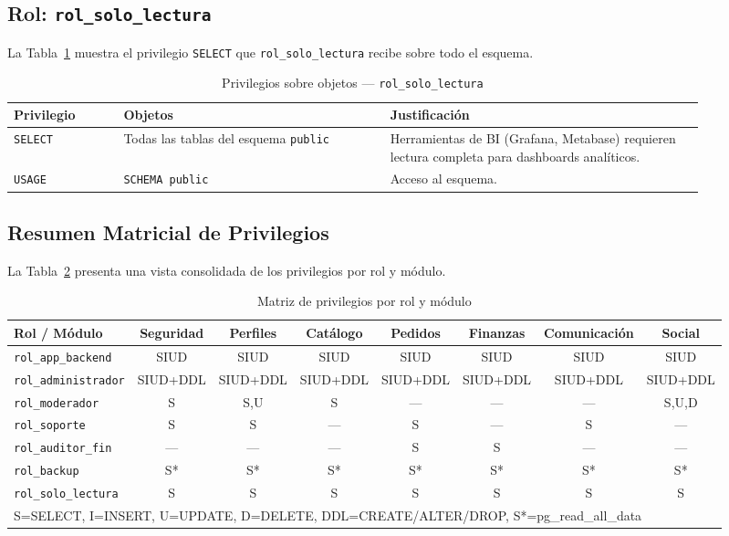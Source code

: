 \documentclass[conference, onecolumn]{IEEEtran}
\begin{document}
\subsection{Rol: \texttt{rol\_solo\_lectura}}

La Tabla~\ref{tab:priv_readonly} muestra el privilegio \texttt{SELECT} que \texttt{rol\_solo\_lectura} recibe sobre todo el esquema.

\begin{table}[H]
\centering
\caption{Privilegios sobre objetos — \texttt{rol\_solo\_lectura}}
\label{tab:priv_readonly}
\scriptsize
\begin{tabular}{>{\raggedright\arraybackslash}p{0.14\linewidth} >{\raggedright\arraybackslash}p{0.34\linewidth} >{\raggedright\arraybackslash}p{0.40\linewidth}}
\toprule
\textbf{Privilegio} & \textbf{Objetos} & \textbf{Justificación} \\
\midrule
\texttt{SELECT} & Todas las tablas del esquema \texttt{public} & Herramientas de BI (Grafana, Metabase) requieren lectura completa para dashboards analíticos. \\
\texttt{USAGE} & \texttt{SCHEMA public} & Acceso al esquema. \\
\bottomrule
\end{tabular}
\end{table}

\subsection{Resumen Matricial de Privilegios}

La Tabla~\ref{tab:matriz_resumen} presenta una vista consolidada de los privilegios por rol y módulo.

\begin{table}[t]
\centering
\caption{Matriz de privilegios por rol y módulo}
\label{tab:matriz_resumen}
\scriptsize
\begin{tabular}{l c c c c c c c}
\toprule
\textbf{Rol / Módulo} & \textbf{Seguridad} & \textbf{Perfiles} & \textbf{Catálogo} & \textbf{Pedidos} & \textbf{Finanzas} & \textbf{Comunicación} & \textbf{Social} \\
\midrule
\texttt{rol\_app\_backend}   & SIUD & SIUD & SIUD & SIUD & SIUD & SIUD & SIUD \\
\texttt{rol\_administrador}  & SIUD+DDL & SIUD+DDL & SIUD+DDL & SIUD+DDL & SIUD+DDL & SIUD+DDL & SIUD+DDL \\
\texttt{rol\_moderador}      & S & S,U & S & --- & --- & --- & S,U,D \\
\texttt{rol\_soporte}        & S & S & --- & S & --- & S & --- \\
\texttt{rol\_auditor\_fin}   & --- & --- & --- & S & S & --- & --- \\
\texttt{rol\_backup}         & S* & S* & S* & S* & S* & S* & S* \\
\texttt{rol\_solo\_lectura}  & S & S & S & S & S & S & S \\
\bottomrule
\multicolumn{8}{l}{\scriptsize S=SELECT, I=INSERT, U=UPDATE, D=DELETE, DDL=CREATE/ALTER/DROP, S*=pg\_read\_all\_data} \\
\end{tabular}
\end{table}
\end{document}
